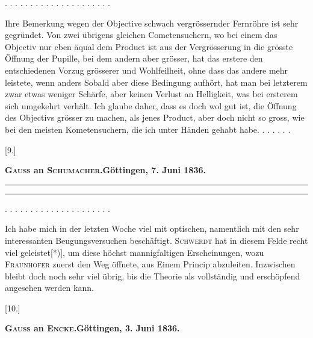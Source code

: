 \noindent . . . . . . . . . . . . . . . . . . . . .\par
\noindent\hspace*{\parindent}Ihre Bemerkung wegen der Objective schwach vergrössernder Fernröhre ist sehr gegründet. Von zwei übrigens gleichen Cometensuchern, wo bei einem das Objectiv nur eben äqual dem Product ist aus der Vergrösserung in die grösste Öffnung der Pupille, bei dem andern aber grösser, hat das erstere den entschiedenen Vorzug grösserer  und Wohlfeilheit, ohne dass das andere mehr leistete, wenn anders  Sobald aber diese Bedingung aufhört, hat man bei letzterem zwar etwas weniger Schärfe, aber keinen Verlust an Helligkeit, was bei ersterem sich umgekehrt verhält. Ich glaube daher, dass es doch wol gut ist, die Öffnung des Objectivs  grösser zu machen, als jenes Product, aber doch nicht so gross, wie bei den meisten Kometensuchern, die ich unter Händen gehabt habe. . . . . . .
\clearpage{}
\begin{center}
[9.]\par\medskip
\textbf{\textsc{Gauss} an \textsc{Schumacher}.\quad Göttingen, 7. Juni 1836.}\par\medskip
\rule{.75\linewidth}{.4pt}\par
[Briefwechsel zwischen \textsc{Gauss} und \textsc{Schumacher} III, S. 62.]\par
\rule{.75\linewidth}{.4pt}
\end{center}
\noindent . . . . . . . . . . . . . . . . . . . . .\par
\noindent\hspace*{\parindent}Ich habe mich in der letzten Woche viel mit optischen, namentlich mit den sehr interessanten Beugungsversuchen beschäftigt. \textsc{Schwerdt} hat in diesem Felde recht viel geleistet[*)], um diese höchst mannigfaltigen Erscheinungen, wozu \textsc{Fraunhofer} zuerst den Weg öffnete, aus Einem Princip abzuleiten. Inzwischen bleibt doch noch sehr viel übrig, bis die Theorie als vollständig und erschöpfend angesehen werden kann.
\begingroup\renewcommand{\thefootnote}{}\endgroup
\bigskip\begin{center}
[10.]\par\medskip
\textbf{\textsc{Gauss} an \textsc{Encke}.\quad Göttingen, 3. Juni 1836.}
\end{center}
